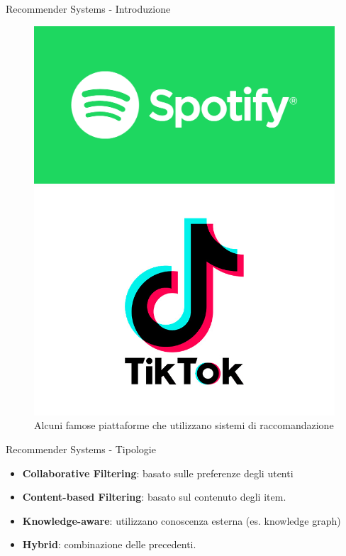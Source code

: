 \begin{frame}{Recommender Systems - Introduzione}
\begin{figure}[h!]
\begin{minipage}{0.15\textwidth}
    \end{minipage}\hfill
    \begin{minipage}{0.15\textwidth}
        \centering
        \includegraphics[width=\textwidth]{images/spotify.png}
    \end{minipage}\hfill
    \begin{minipage}{0.15\textwidth}
        \centering
        \includegraphics[width=\textwidth]{images/tiktok.png}
    \end{minipage}
    \caption{Alcuni famose piattaforme che utilizzano sistemi di raccomandazione}
\end{figure}
\end{frame}

\begin{frame}{Recommender Systems - Tipologie}
\begin{itemize}
    \item \textbf{Collaborative Filtering}: basato sulle preferenze degli utenti
    \item \textbf{Content-based Filtering}: basato sul contenuto degli item.
    \item \textbf{Knowledge-aware}: utilizzano conoscenza esterna (es. knowledge graph)
    \item \textbf{Hybrid}: combinazione delle precedenti.
\end{itemize}
\end{frame}
